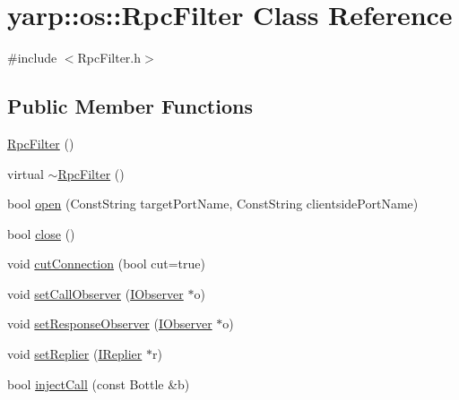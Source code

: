 \hypertarget{classyarp_1_1os_1_1_rpc_filter}{
\section{yarp::os::RpcFilter Class Reference}
\label{classyarp_1_1os_1_1_rpc_filter}
}


{\ttfamily \#include $<$RpcFilter.h$>$}\subsection*{Public Member Functions}
\begin{DoxyCompactItemize}
\item 
\hyperlink{classyarp_1_1os_1_1_rpc_filter_a6be8523a6258d84266a57734c907b70c}{RpcFilter} ()
\item 
virtual \hyperlink{classyarp_1_1os_1_1_rpc_filter_abcf7b927eb6c44e70087d44e72a9da52}{$\sim$RpcFilter} ()
\item 
bool \hyperlink{classyarp_1_1os_1_1_rpc_filter_adeb2b65f313a9ef7986244d81fdab354}{open} (ConstString targetPortName, ConstString clientsidePortName)
\item 
bool \hyperlink{classyarp_1_1os_1_1_rpc_filter_a7c3fd3737767ad8ae8730e44e96d1f20}{close} ()
\item 
void \hyperlink{classyarp_1_1os_1_1_rpc_filter_ae7a72f77f502c0872a3efb87cffb17e4}{cutConnection} (bool cut=true)
\item 
void \hyperlink{classyarp_1_1os_1_1_rpc_filter_a36f86ee737cfff2cb29b8b0187bffe84}{setCallObserver} (\hyperlink{classyarp_1_1os_1_1_i_observer}{IObserver} $\ast$o)
\item 
void \hyperlink{classyarp_1_1os_1_1_rpc_filter_a9842c9621ae44b7f09e7faf33277dc05}{setResponseObserver} (\hyperlink{classyarp_1_1os_1_1_i_observer}{IObserver} $\ast$o)
\item 
void \hyperlink{classyarp_1_1os_1_1_rpc_filter_a266cce1c8c9088b26ad7d6c65fc2201f}{setReplier} (\hyperlink{classyarp_1_1os_1_1_i_replier}{IReplier} $\ast$r)
\item 
bool \hyperlink{classyarp_1_1os_1_1_rpc_filter_a18789775d8040efabf1bc8df5d0f1c86}{injectCall} (const Bottle \&b)
\end{DoxyCompactItemize}


